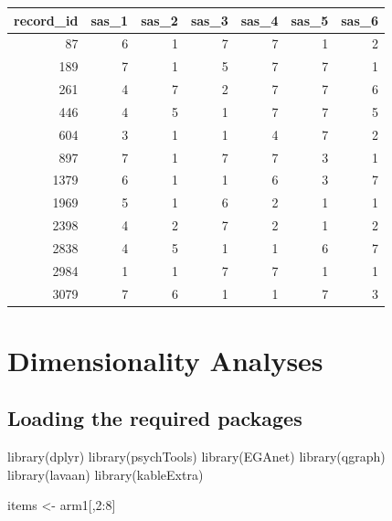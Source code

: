 \documentclass[
  letterpaper,
  DIV=11,
  numbers=noendperiod]{scrreprt}
\newenvironment{Shaded}{\begin{snugshade}}{\end{snugshade}}
\newcommand{\DecValTok}[1]{\textcolor[rgb]{0.68,0.00,0.00}{#1}}
\newcommand{\FunctionTok}[1]{\textcolor[rgb]{0.28,0.35,0.67}{#1}}
\newcommand{\NormalTok}[1]{\textcolor[rgb]{0.00,0.23,0.31}{#1}}
\newcommand{\OtherTok}[1]{\textcolor[rgb]{0.00,0.23,0.31}{#1}}
\newcommand{\SpecialCharTok}[1]{\textcolor[rgb]{0.37,0.37,0.37}{#1}}
\begin{document}
\begin{tabular}[t]{r|r|r|r|r|r|r}
\hline
record\_id & sas\_1 & sas\_2 & sas\_3 & sas\_4 & sas\_5 & sas\_6\\
\hline
87 & 6 & 1 & 7 & 7 & 1 & 2\\
\hline
189 & 7 & 1 & 5 & 7 & 7 & 1\\
\hline
261 & 4 & 7 & 2 & 7 & 7 & 6\\
\hline
446 & 4 & 5 & 1 & 7 & 7 & 5\\
\hline
604 & 3 & 1 & 1 & 4 & 7 & 2\\
\hline
897 & 7 & 1 & 7 & 7 & 3 & 1\\
\hline
1379 & 6 & 1 & 1 & 6 & 3 & 7\\
\hline
1969 & 5 & 1 & 6 & 2 & 1 & 1\\
\hline
2398 & 4 & 2 & 7 & 2 & 1 & 2\\
\hline
2838 & 4 & 5 & 1 & 1 & 6 & 7\\
\hline
2984 & 1 & 1 & 7 & 7 & 1 & 1\\
\hline
3079 & 7 & 6 & 1 & 1 & 7 & 3\\
\hline
\end{tabular}


\hypertarget{dimensionality-analyses}{%
\chapter{Dimensionality Analyses}\label{dimensionality-analyses}}

\hypertarget{loading-the-required-packages-1}{%
\section{Loading the required
packages}\label{loading-the-required-packages-1}}

\begin{Shaded}
\begin{Highlighting}[]
\FunctionTok{library}\NormalTok{(dplyr)}
\FunctionTok{library}\NormalTok{(psychTools)}
\FunctionTok{library}\NormalTok{(EGAnet)}
\FunctionTok{library}\NormalTok{(qgraph)}
\FunctionTok{library}\NormalTok{(lavaan)}
\FunctionTok{library}\NormalTok{(kableExtra)}
\end{Highlighting}
\end{Shaded}

\begin{Shaded}
\begin{Highlighting}[]
\NormalTok{items }\OtherTok{\textless{}{-}}\NormalTok{ arm1[,}\DecValTok{2}\SpecialCharTok{:}\DecValTok{8}\NormalTok{]}
\end{Highlighting}
\end{Shaded}
\end{document}
